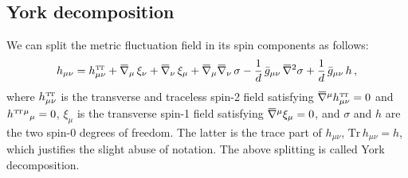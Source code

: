 \documentclass[11pt]{book}
\newcommand{\overbar}[1]{\mkern 1.5mu\overline{\mkern-1.5mu#1\mkern-1.5mu}\mkern 1.5mu}
\newcommand\TTspace{ -1pt }
\newcommand\bgmunu{ \bar g_{\mu\nu} }
\newcommand\TT{ \scriptscriptstyle{\mathrm{T\hspace{\TTspace}T}} }
\newcommand\hTTmunu{ h^{\scriptscriptstyle{\mathrm{T\hspace{\TTspace}T}}}_{\mu\nu} }
\newcommand{\bnabla}{\overbar \nabla}
\newcommand{\Tr}{\mathrm{Tr}}
\numberwithin{equation}{chapter}
\begin{document}
\begin{appendices}
\section{York decomposition}

We can split the metric fluctuation field in its spin components as follows:
\begin{align}
  h_{\mu\nu} = \hTTmunu
             + \bnabla_\mu \, \xi_\nu
             + \bnabla_\nu \, \xi_\mu
             + \bnabla_\mu \bnabla_\nu \, \sigma
             - \frac{1}{d} \, \bgmunu \, \bnabla^2\sigma
             + \frac{1}{d} \, \bgmunu \, h \,,
  \label{eq:york_decomposition}
\end{align}
where $\hTTmunu$ is the transverse and traceless spin-2 field satisfying
$\bnabla^\mu \hTTmunu = 0$ and $h^{\TT}{}^\mu{}_\mu=0$, $\xi_\mu$ is the
transverse spin-1 field satisfying $\bnabla^\mu \xi_\mu=0$, and
$\sigma$ and $h$ are the two spin-0 degrees of freedom.
The latter is the trace part of $h_{\mu\nu}$, $\Tr \, h_{\mu\nu} = h$,
which justifies the slight abuse of notation. The above
splitting is called York decomposition.


\end{appendices}
\end{document}
